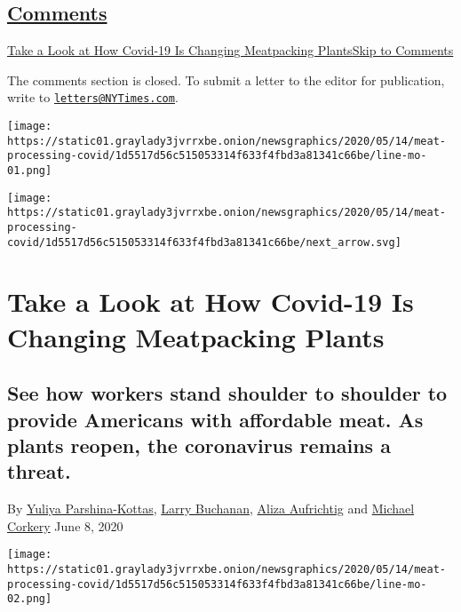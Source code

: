 \hypertarget{comments}{%
\subsection{\texorpdfstring{\protect\hyperlink{commentsContainer}{Comments}}{Comments}}\label{comments}}

\href{}{Take a Look at How Covid-19 Is Changing Meatpacking
Plants}\href{}{Skip to Comments}

The comments section is closed. To submit a letter to the editor for
publication, write to
\href{mailto:letters@NYTimes.com}{\nolinkurl{letters@NYTimes.com}}.

\texttt{[image: https://static01.graylady3jvrrxbe.onion/newsgraphics/2020/05/14/meat-processing-covid/1d5517d56c515053314f633f4fbd3a81341c66be/line-mo-01.png]}

\texttt{[image: https://static01.graylady3jvrrxbe.onion/newsgraphics/2020/05/14/meat-processing-covid/1d5517d56c515053314f633f4fbd3a81341c66be/next\_arrow.svg]}

\hypertarget{take-a-look-at-how-covid-19-is-changing-meatpacking-plants}{%
\section{Take a Look at How Covid-19 Is Changing Meatpacking
Plants}\label{take-a-look-at-how-covid-19-is-changing-meatpacking-plants}}

\hypertarget{see-how-workers-stand-shoulder-to-shoulder-to-provide-americans-with-affordable-meat-as-plants-reopen-the-coronavirus-remains-a-threat}{%
\subsection{See how workers stand shoulder to shoulder to provide
Americans with affordable meat. As plants reopen, the coronavirus
remains a
threat.}\label{see-how-workers-stand-shoulder-to-shoulder-to-provide-americans-with-affordable-meat-as-plants-reopen-the-coronavirus-remains-a-threat}}

By
\href{https://www.nytimes3xbfgragh.onion/by/yuliya-parshina-kottas}{Yuliya
Parshina-Kottas},
\href{https://www.nytimes3xbfgragh.onion/by/larry-buchanan}{Larry
Buchanan},
\href{https://www.nytimes3xbfgragh.onion/by/aliza-aufrichtig}{Aliza
Aufrichtig} and
\href{https://www.nytimes3xbfgragh.onion/by/michael-corkery}{Michael
Corkery} June 8, 2020

\texttt{[image: https://static01.graylady3jvrrxbe.onion/newsgraphics/2020/05/14/meat-processing-covid/1d5517d56c515053314f633f4fbd3a81341c66be/line-mo-02.png]}

